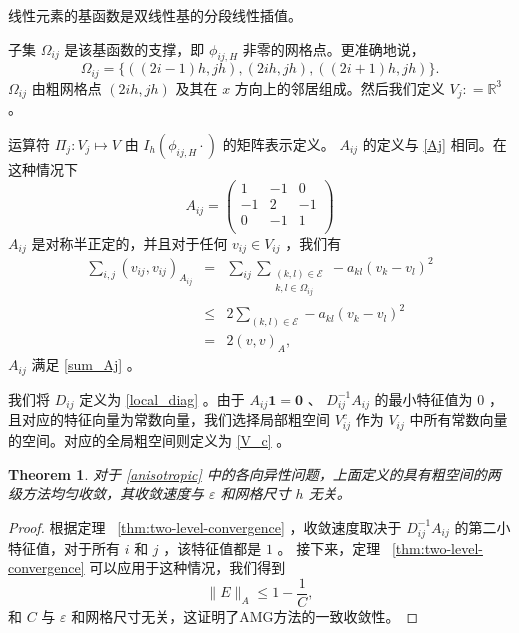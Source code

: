 \documentclass[12pt]{acta_2011xz}
\newtheorem{theorem}{Theorem}[section]
\begin{document}
线性元素的基函数是双线性基的分段线性插值。  

子集    $\Omega_{ij}$    是该基函数的支撑，即    $\phi_{ij,H}$    非零的网格点。更准确地说，
   \begin{equation}\label{anisotropic_omega}
    \Omega_{ij}= \{ ((2i-1)h, jh), (2ih, jh), ((2i+1)h, jh) \} .
\end{equation}    
   $\Omega_{ij}$    由粗网格点    $(2ih, jh)$    及其在    $x$    方向上的邻居组成。然后我们定义    $V_j: =\mathbb{R}^3$    。  

运算符    $\Pi_j: V_j\mapsto V$    由    $I_h(\phi_{ij,H}\cdot)$    的矩阵表示定义。   $A_{ij}$    的定义与    \eqref{Aj}    相同。在这种情况下 
   \begin{equation}\label{anisotropic_localA}
    A_{ij}= \begin{pmatrix}
        1 & -1 & 0 \\ 
        -1 & 2 & -1 \\ 
        0 & -1 & 1 \\ 
        \end{pmatrix}
\end{equation}    
   $A_{ij}$    是对称半正定的，并且对于任何    $v_{ij}\in V_{ij}$    ，我们有
   \begin{eqnarray*}
    \sum_{i,j}(v_{ij}, v_{ij})_{A_{ij}}&=&\sum_{ij}\sum_{\substack{(k,l)\in \mathcal E \\  k, l\in \Omega_{ij}}}-a_{kl}(v_k-v_l)^2 \\ 
    &\le & 2\sum_{(k, l)\in \mathcal E}-a_{kl}(v_k-v_l)^2 \\ 
    & = & 2(v, v)_A,
\end{eqnarray*}    
   $A_{ij}$    满足    \eqref{sum_Aj}    。  

我们将    $D_{ij}$    定义为    \eqref{local_diag}    。由于    $A_{ij}\bm 1 = \bm 0$    、   $D_{ij}^{-1}A_{ij}$    的最小特征值为    $0$    ，且对应的特征向量为常数向量，我们选择局部粗空间    $V_{ij}^c$    作为    $V_{ij}$    中所有常数向量的空间。对应的全局粗空间则定义为    \eqref{V_c}    。  

   \begin{theorem}对于    \eqref{anisotropic}    中的各向异性问题，上面定义的具有粗空间的两级方法均匀收敛，其收敛速度与    $\varepsilon$    和网格尺寸    $h$    无关。  \end{theorem}    
   \begin{proof}根据定理~   \ref{thm:two-level-convergence}   ，收敛速度取决于   $D_{ij}^{-1}A_{ij}$   的第二小特征值，对于所有   $i$   和   $j$   ，该特征值都是   $1$   。
接下来，定理~   \ref{thm:two-level-convergence}   可以应用于这种情况，我们得到
   \begin{equation}
        \|E\|_{A} \le 1- \frac{1}{C},
    \end{equation}   和   $C$   与   $\varepsilon$   和网格尺寸无关，这证明了AMG方法的一致收敛性。  \end{proof}     
\end{document}
